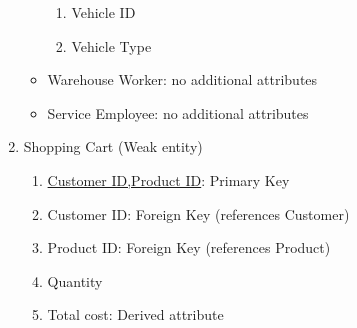 \documentclass[12pt]{report}
\begin{document}
\begin{enumerate}
\begin{itemize}
                    \begin{enumerate}
                        \item Vehicle ID
                        \item Vehicle Type
                    \end{enumerate}
                \item Warehouse Worker: no additional attributes
                \item Service Employee: no additional attributes
            \end{itemize}
        \item Shopping Cart (Weak entity)
            \begin{enumerate}
                \item \underline{Customer ID,Product ID}: Primary Key
                \item Customer ID: Foreign Key (references Customer)
                \item Product ID: Foreign Key (references Product)
                \item Quantity
                \item Total cost: Derived attribute

            \end{enumerate}
        
    \end{enumerate}
\end{document}
